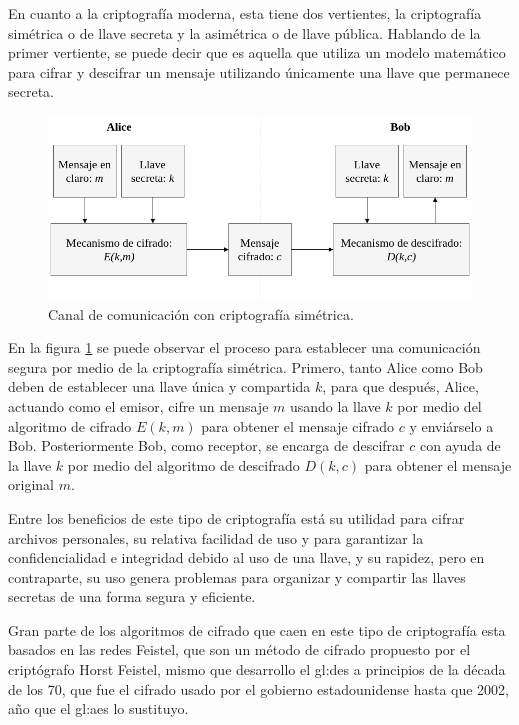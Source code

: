   En cuanto a la criptografía moderna, esta tiene dos vertientes, la
  criptografía simétrica o de llave secreta y la asimétrica o de llave
  pública. Hablando de la primer vertiente, se puede decir que es aquella
  que utiliza un modelo matemático para cifrar y descifrar un mensaje
  utilizando únicamente una llave que permanece secreta.

  \begin{figure}[H]
    \begin{center}
      \includegraphics[width=0.8\linewidth]
        {contenidos/antecedentes/intro/img/cripto_simetrica.png}
      \caption{Canal de comunicación con criptografía simétrica.}
      \label{cripto_simetrica}
    \end{center}
  \end{figure}

  En la figura \ref{cripto_simetrica} se puede observar el proceso para 
  establecer una comunicación segura por medio de la criptografía simétrica. 
  Primero, tanto Alice como Bob deben de establecer una llave única y 
  compartida $k$, para que después, Alice, actuando como el emisor, cifre un 
  mensaje $m$ usando la llave $k$ por medio del algoritmo de cifrado $E(k,m)$ 
  para obtener el mensaje cifrado $c$ y enviárselo a Bob. Posteriormente Bob, 
  como receptor, se encarga de descifrar $c$ con ayuda de la llave $k$ por 
  medio del algoritmo de descifrado $D(k,c)$ para obtener el mensaje original 
  $m$.

  Entre los beneficios de este tipo de criptografía está su utilidad para
  cifrar archivos personales, su relativa facilidad de uso y para garantizar
  la confidencialidad e integridad debido al uso de una llave, y su rapidez,
  pero en contraparte, su uso genera problemas para organizar y compartir
  las llaves secretas de una forma segura y eficiente.

  Gran parte de los algoritmos de cifrado que caen en este tipo de criptografía 
  esta basados en las redes Feistel, que son un método de cifrado propuesto por 
  el criptógrafo Horst Feistel, mismo que desarrollo el \acrfull{gl:des} a 
  principios de la década de los 70, que fue el cifrado usado por el gobierno 
  estadounidense hasta que 2002, año que el \acrfull{gl:aes} lo sustituyo. 

